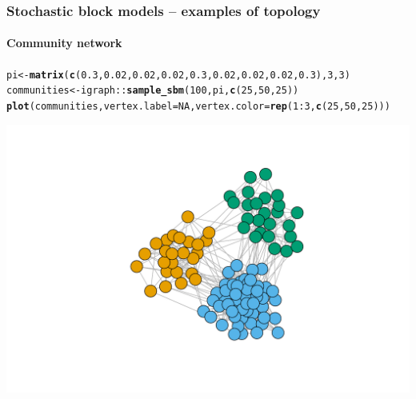 \documentclass{beamer}\usepackage[]{graphicx}\usepackage[]{color}
\makeatletter
\newcommand{\hlnum}[1]{\textcolor[rgb]{0.686,0.059,0.569}{#1}}%
\newcommand{\hlopt}[1]{\textcolor[rgb]{0,0,0}{#1}}%
\newcommand{\hlstd}[1]{\textcolor[rgb]{0.345,0.345,0.345}{#1}}%
\newcommand{\hlkwb}[1]{\textcolor[rgb]{0.69,0.353,0.396}{#1}}%
\newcommand{\hlkwc}[1]{\textcolor[rgb]{0.333,0.667,0.333}{#1}}%
\newcommand{\hlkwd}[1]{\textcolor[rgb]{0.737,0.353,0.396}{\textbf{#1}}}%
\newenvironment{kframe}{%
 \def\at@end@of@kframe{}%
 \ifinner\ifhmode%
  \def\at@end@of@kframe{\end{minipage}}%
  \begin{minipage}{\columnwidth}%
 \fi\fi%
 \def\FrameCommand##1{\hskip\@totalleftmargin \hskip-\fboxsep
 \colorbox{shadecolor}{##1}\hskip-\fboxsep
     \hskip-\linewidth \hskip-\@totalleftmargin \hskip\columnwidth}%
 \MakeFramed {\advance\hsize-\width
   \@totalleftmargin\z@ \linewidth\hsize
   \@setminipage}}%
 {\par\unskip\endMakeFramed%
 \at@end@of@kframe}
\newenvironment{knitrout}{}{} %
\makeatother
\begin{document}
\begin{frame}[fragile]
  \frametitle{Stochastic block models -- examples of topology}
  \framesubtitle{Community network}

\begin{knitrout}\scriptsize
{}\color{fgcolor}\begin{kframe}
\begin{alltt}
\hlstd{pi} \hlkwb{<-} \hlkwd{matrix}\hlstd{(}\hlkwd{c}\hlstd{(}\hlnum{0.3}\hlstd{,}\hlnum{0.02}\hlstd{,}\hlnum{0.02}\hlstd{,}\hlnum{0.02}\hlstd{,}\hlnum{0.3}\hlstd{,}\hlnum{0.02}\hlstd{,}\hlnum{0.02}\hlstd{,}\hlnum{0.02}\hlstd{,}\hlnum{0.3}\hlstd{),}\hlnum{3}\hlstd{,}\hlnum{3}\hlstd{)}
\hlstd{communities} \hlkwb{<-} \hlstd{igraph}\hlopt{::}\hlkwd{sample_sbm}\hlstd{(}\hlnum{100}\hlstd{, pi,} \hlkwd{c}\hlstd{(}\hlnum{25}\hlstd{,} \hlnum{50}\hlstd{,} \hlnum{25}\hlstd{))}
\hlkwd{plot}\hlstd{(communities,} \hlkwc{vertex.label}\hlstd{=}\hlnum{NA}\hlstd{,} \hlkwc{vertex.color} \hlstd{=} \hlkwd{rep}\hlstd{(}\hlnum{1}\hlopt{:}\hlnum{3}\hlstd{,}\hlkwd{c}\hlstd{(}\hlnum{25}\hlstd{,} \hlnum{50}\hlstd{,} \hlnum{25}\hlstd{)))}
\end{alltt}
\end{kframe}
\includegraphics[width=.8\textwidth]{figures/unnamed-chunk-1-1} 

\end{knitrout}

\end{frame}
\end{document}
